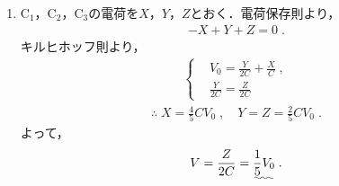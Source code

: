 \documentclass[../../../physics-standard_answers_all.tex]{subfiles}
\begin{document}
\begin{enumerate}
    \item C$_1$，C$_2$，C$_3$の電荷を$X$，$Y$，$Z$とおく．電荷保存則より，
        \begin{align*}
            -X + Y + Z = 0 \;.
        \end{align*}
        キルヒホッフ則より，
        \begin{align*}
            \left\{
            \begin{aligned}
                & V_0 = \frac{Y}{2C} +  \frac{X}{C} \;, \\
                & \frac{Y}{2C} = \frac{Z}{2C}
            \end{aligned}
            \right.
        \end{align*}
        \begin{align*}
                \text{∴} \; X = \frac{4}{5} CV_0 \;,
                \quad Y = Z = \frac{2}{5} CV_0 \;.
        \end{align*}
        よって，
        \begin{align*}
            V = \frac{Z}{2C} = \uwave{\frac{1}{5} V_0} \;.
        \end{align*}        

\end{enumerate}
\end{document}
